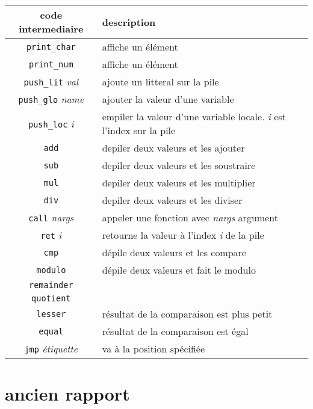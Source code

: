 \documentclass[12pt]{article}
\begin{document}
\begin{table}[h]
	\begin{tabular}{|c|l|}
		\hline
		code intermediaire & description \\ \hline
		\texttt{print\_char} & affiche un élément \\ \hline
		\texttt{print\_num} & affiche un élément \\ \hline
		
		\texttt{push\_lit} \emph{val}& ajoute un litteral sur la pile\\ \hline
		\texttt{push\_glo} \emph{name} & ajouter la valeur d'une variable\\ \hline
		\texttt{push\_loc} \emph{i} & empiler la valeur d'une variable locale. \emph{i} est l'index sur la pile\\ \hline
		\texttt{add}	& depiler deux valeurs et les ajouter \\ \hline
		\texttt{sub}	& depiler deux valeurs et les soustraire \\ \hline
		\texttt{mul}	& depiler deux valeurs et les multiplier \\ \hline
		\texttt{div}	& depiler deux valeurs et les diviser \\ \hline
		\texttt{call} \emph{nargs} & appeler une fonction avec \emph{nargs} argument\\ \hline
		\texttt{ret} \emph{i} & retourne la valeur à l'index \emph{i} de la pile\\  \hline
		\texttt{cmp} & dépile deux valeurs et les compare \\ \hline
		\texttt{modulo} & dépile deux valeurs et fait le modulo \\ \hline
        \texttt{remainder} & \\ \hline
        \texttt{quotient} & \\ \hline
        \texttt{lesser} & résultat de la comparaison est plus petit \\ \hline
        \texttt{equal} & résultat de la comparaison est égal \\ \hline
        \texttt{jmp} \emph{étiquette} & va à la position spécifiée\\ \hline 
	\end{tabular}
\end{table}

\newpage
\section{ancien rapport}
\end{document}
